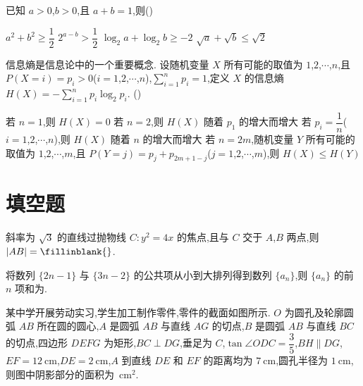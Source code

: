 \begin{problem}
已知 \(a>0\),\(b>0\),且 \(a+b=1\),则(\quad)

\choices
    {\(a^2+b^2\ge\dfrac{1}{2}\)}
    {\(2^{a-b}>\dfrac{1}{2}\)}
    {\(\log_2 a+\log_2 b\ge -2\)}
    {\(\sqrt{a}+\sqrt{b}\le\sqrt{2}\)}
\end{problem}

\begin{problem}
信息熵是信息论中的一个重要概念. 设随机变量 \(X\) 所有可能的取值为 \(1\),\(2\),\(\cdots\),\(n\),且 \(P(X=i)=p_i>0\)(\(i=1\),\(2\),\(\cdots\),\(n\)),\(\sum_{i=1}^{n}p_i=1\),定义 \(X\) 的信息熵 \(H(X)=-\sum_{i=1}^{n}p_i\log_2 p_i\). (\quad)

\choices
    {若 \(n=1\),则 \(H(X)=0\)}
    {若 \(n=2\),则 \(H(X)\) 随着 \(p_1\) 的增大而增大}
    {若 \(p_i=\dfrac{1}{n}\)(\(i=1\),\(2\),\(\cdots\),\(n\)),则 \(H(X)\) 随着 \(n\) 的增大而增大}
    {若 \(n=2m\),随机变量 \(Y\) 所有可能的取值为 \(1\),\(2\),\(\cdots\),\(m\),且 \(P(Y=j)=p_j+p_{2m+1-j}\)(\(j=1\),\(2\),\(\cdots\),\(m\)),则 \(H(X)\le H(Y)\)}
\end{problem}

\section{填空题}

\begin{problem}
斜率为 \(\sqrt{3}\) 的直线过抛物线 \(C:y^2=4x\) 的焦点,且与 \(C\) 交于 \(A\),\(B\) 两点,则 \(|AB|=\fillinblank{}\).
\end{problem}

\begin{problem}
将数列 \(\{2n-1\}\) 与 \(\{3n-2\}\) 的公共项从小到大排列得到数列 \(\{a_n\}\),则 \(\{a_n\}\) 的前 \(n\) 项和为\fillinblank{}.
\end{problem}

\begin{problem}
某中学开展劳动实习,学生加工制作零件,零件的截面如图所示. \(O\) 为圆孔及轮廓圆弧 \(AB\) 所在圆的圆心,\(A\) 是圆弧 \(AB\) 与直线 \(AG\) 的切点,\(B\) 是圆弧 \(AB\) 与直线 \(BC\) 的切点,四边形 \(DEFG\) 为矩形,\(BC\perp DG\),垂足为 \(C\),\(\tan\angle ODC=\dfrac{3}{5}\),\(BH\parallel DG\),\(EF=12 \mathrm{~cm}\),\(DE=2 \mathrm{~cm}\),\(A\) 到直线 \(DE\) 和 \(EF\) 的距离均为 \(7 \mathrm{~cm}\),圆孔半径为 \(1 \mathrm{~cm}\),则图中阴影部分的面积为\fillinblank{}\ \(\mathrm{cm}^2\).

\end{problem}

